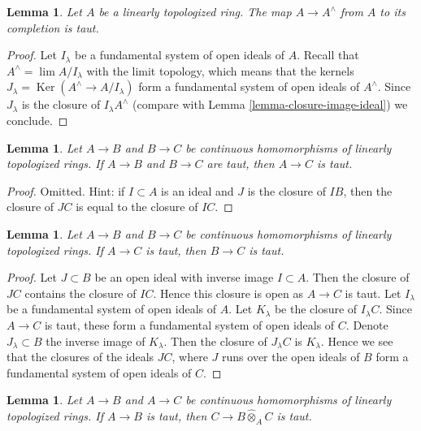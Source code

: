 \documentclass{stacks-project}
\theoremstyle{plain}
\newtheorem{lemma}[subsection]{Lemma}
\theoremstyle{definition}
\theoremstyle{remark}
\numberwithin{equation}{subsection}
\def\lim{\mathop{\mathrm{lim}}\nolimits}
\def\Ker{\mathop{\mathrm{Ker}}}
\begin{document}
\begin{lemma}
\label{lemma-completion-taut}
Let $A$ be a linearly topologized ring. The map $A \to A^\wedge$
from $A$ to its completion is taut.
\end{lemma}

\begin{proof}
Let $I_\lambda$ be a fundamental system of open ideals of $A$.
Recall that $A^\wedge = \lim A/I_\lambda$ with the limit topology,
which means that the kernels $J_\lambda = \Ker(A^\wedge \to A/I_\lambda)$
form a fundamental system of open ideals of $A^\wedge$.
Since $J_\lambda$ is the closure of $I_\lambda A^\wedge$
(compare with Lemma \ref{lemma-closure-image-ideal}) we conclude.
\end{proof}

\begin{lemma}
\label{lemma-composition-taut}
Let $A \to B$ and $B \to C$ be continuous homomorphisms of
linearly topologized rings. If $A \to B$ and $B \to C$ are taut, then
$A \to C$ is taut.
\end{lemma}

\begin{proof}
Omitted. Hint: if $I \subset A$ is an ideal and $J$ is the closure
of $IB$, then the closure of $JC$ is equal to the closure of $IC$.
\end{proof}

\begin{lemma}
\label{lemma-permanence-taut}
Let $A \to B$ and $B \to C$ be continuous homomorphisms of
linearly topologized rings. If $A \to C$ is taut, then
$B \to C$ is taut.
\end{lemma}

\begin{proof}
Let $J \subset B$ be an open ideal with inverse image $I \subset A$.
Then the closure of $JC$ contains the closure of $IC$. Hence this
closure is open as $A \to C$ is taut. Let $I_\lambda$ be a fundamental
system of open ideals of $A$. Let $K_\lambda$ be the closure of
$I_\lambda C$. Since $A \to C$ is taut, these form a fundamental
system of open ideals of $C$. Denote $J_\lambda \subset B$ the inverse image
of $K_\lambda$. Then the closure of $J_\lambda C$ is $K_\lambda$.
Hence we see that the closures of the ideals $JC$, where $J$ runs over
the open ideals of $B$ form a fundamental system of open ideals of $C$.
\end{proof}

\begin{lemma}
\label{lemma-base-change-taut}
Let $A \to B$ and $A \to C$ be continuous homomorphisms of
linearly topologized rings. If $A \to B$ is taut, then
$C \to B \widehat{\otimes}_A C$ is taut.
\end{lemma}
\end{document}

